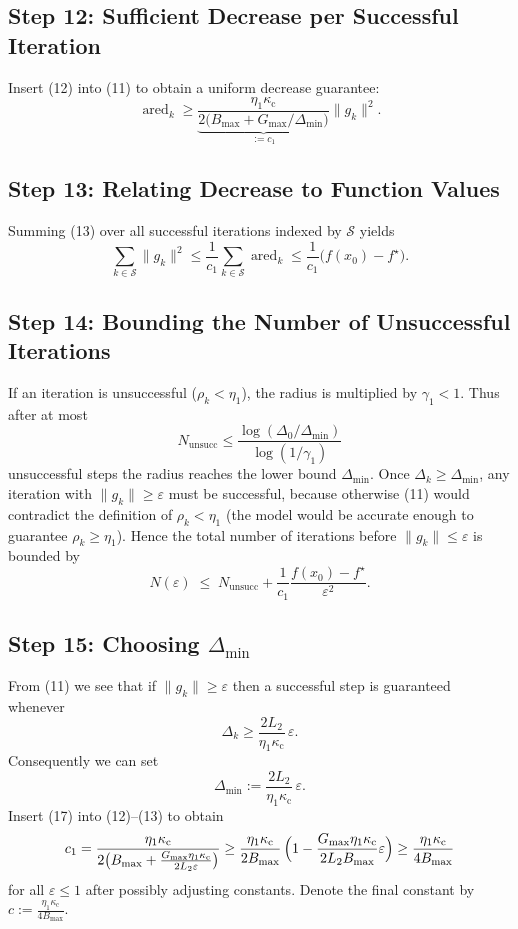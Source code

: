 \documentclass[11pt]{article}
\begin{document}
\subsection*{Step 12: Sufficient Decrease per Successful Iteration}
Insert (12) into (11) to obtain a uniform decrease guarantee:
\[
\operatorname{ared}_{k}
\ge \underbrace{\frac{\eta_{1}\kappa_{\mathrm{c}}}{2\bigl(B_{\max}+G_{\max}/\Delta_{\min}\bigr)}}_{:=c_{1}}
\|g_{k}\|^{2}.
\tag{13}
\]

\subsection*{Step 13: Relating Decrease to Function Values}
Summing (13) over all successful iterations indexed by $\mathcal{S}$ yields
\[
\sum_{k\in\mathcal{S}} \|g_{k}\|^{2}
\le \frac{1}{c_{1}}\sum_{k\in\mathcal{S}}\operatorname{ared}_{k}
\le \frac{1}{c_{1}}\bigl(f(x_{0})-f^{\star}\bigr).
\tag{14}
\]

\subsection*{Step 14: Bounding the Number of Unsuccessful Iterations}
If an iteration is unsuccessful ($\rho_{k}<\eta_{1}$), the radius is multiplied by $\gamma_{1}<1$.
Thus after at most
\[
N_{\text{unsucc}} \le \frac{\log(\Delta_{0}/\Delta_{\min})}{\log(1/\gamma_{1})}
\tag{15}
\]
unsuccessful steps the radius reaches the lower bound $\Delta_{\min}$.  Once $\Delta_{k}\ge\Delta_{\min}$, any iteration with $\|g_{k}\|\ge\varepsilon$ must be successful, because otherwise (11) would contradict the definition of $\rho_{k}<\eta_{1}$ (the model would be accurate enough to guarantee $\rho_{k}\ge\eta_{1}$).  Hence the total number of iterations before $\|g_{k}\|\le\varepsilon$ is bounded by
\[
N(\varepsilon)\;\le\; N_{\text{unsucc}}+\frac{1}{c_{1}}\frac{f(x_{0})-f^{\star}}{\varepsilon^{2}}.
\tag{16}
\]

\subsection*{Step 15: Choosing $\Delta_{\min}$}
From (11) we see that if $\|g_{k}\|\ge\varepsilon$ then a successful step is guaranteed whenever
\[
\Delta_{k}\ge
\frac{2L_{2}}{\eta_{1}\kappa_{\mathrm{c}}}\,\varepsilon.
\]
Consequently we can set
\[
\Delta_{\min}:=\frac{2L_{2}}{\eta_{1}\kappa_{\mathrm{c}}}\,\varepsilon.
\tag{17}
\]
Insert (17) into (12)–(13) to obtain
\[
c_{1}= \frac{\eta_{1}\kappa_{\mathrm{c}}}{2\bigl(B_{\max}+ \frac{G_{\max}\eta_{1}\kappa_{\mathrm{c}}}{2L_{2}\varepsilon}\bigr)}
\ge \frac{\eta_{1}\kappa_{\mathrm{c}}}{2B_{\max}}\,\Bigl(1-\frac{G_{\max}\eta_{1}\kappa_{\mathrm{c}}}{2L_{2}B_{\max}}\varepsilon\Bigr)
\ge \frac{\eta_{1}\kappa_{\mathrm{c}}}{4B_{\max}}
\]
for all $\varepsilon\le 1$ after possibly adjusting constants.  Denote the final constant by $c:=\frac{\eta_{1}\kappa_{\mathrm{c}}}{4B_{\max}}$.
\end{document}
